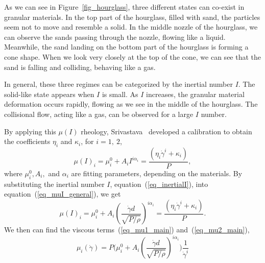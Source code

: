 As we can see in Figure~\ref{fig_hourglass}, three different states can co-exist in granular materials. 
In the top part of the hourglass, filled with sand, the particles seem not to move and resemble a solid. 
In the middle nozzle of the hourglass, we can observe the sands passing through the nozzle, flowing like a liquid.
Meanwhile, the sand landing on the bottom part of the hourglass is forming a cone shape. When we look very closely at the top of the cone, we can see that the sand is falling and colliding, behaving like a gas.
\par
In general, these three regimes can be categorized by the inertial number $I$. The solid-like state appears when $I$ is small. As $I$ increases, the granular material deformation occurs rapidly, flowing as we see in the middle of the hourglass. The collisional flow, acting like a gas, can be observed for a large $I$ number. 
\par
By applying this $\mu(I)$ rheology, Srivastava~\cite{srivastava_viscometric_2021} developed a calibration to obtain the coefficients $\eta_i$ and $\kappa_i$, for $i = 1, \ 2$,
\begin{equation}
  \mu(I)_i = \mu_i^0 + A_i{ I}^{ i \alpha_i} =  \frac{(\eta_i \dot{\gamma}^i + \kappa_i)}{P},
\label{eq_muI_general}
\end{equation}
where $\mu_i^0, A_i,$ and $\alpha_i$ are fitting parameters, depending on the materials. 
By substituting the inertial number $I$, equation~(\ref{eq_inertialI}), into equation~(\ref{eq_muI_general}),
we get
\begin{equation}
  \mu(I)_i = \mu_i^0 + A_i {\left(  \frac{\dot{\gamma} d }{\sqrt{P/\rho}}\right) }^{ i \alpha_i} =  \frac{(\eta_i \dot{\gamma}^i + \kappa_i)}{P}.
\label{eq_muI_I}
\end{equation}
We then can find the viscous terms~(\ref{eq_mu1_main}) and~(\ref{eq_mu2_main}),
\begin{equation}
  \mu_i  (\dot{\gamma})= 
 P \Biggl( \mu_i^0 + A_i {\left(  \frac{\dot{\gamma} d }{\sqrt{P/\rho}}\right) }^{ i \alpha_i}\Biggr) 
   \frac{1}{\dot{\gamma}^i}
\label{eq_eta1}
\end{equation}

